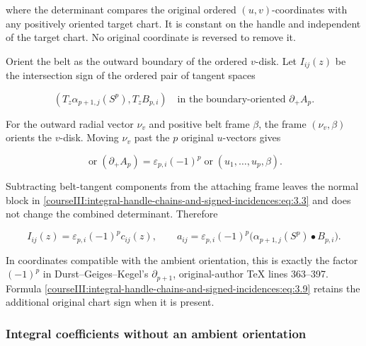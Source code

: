 where the determinant compares the original ordered \((u,v)\)-coordinates with any positively oriented target chart. It is constant on the handle and independent of the target chart. No original coordinate is reversed to remove it.

Orient the belt as the outward boundary of the ordered \(v\)-disk. Let \(I_{ij}(z)\) be the intersection sign of the ordered pair of tangent spaces

\begin{equation}
(T_z\alpha_{p+1,j}(S^p),T_zB_{p,i})
 \quad\text{in the boundary-oriented }\partial_+A_p.
 \label{courseIII:integral-handle-chains-and-signed-incidences:eq:3.7}
\end{equation}

For the outward radial vector \(\nu_v\) and positive belt frame \(\beta\), the frame \((\nu_v,\beta)\) orients the \(v\)-disk. Moving \(\nu_v\) past the \(p\) original \(u\)-vectors gives

\begin{equation}
\operatorname{or}(\partial_+A_p)
 =\varepsilon_{p,i}(-1)^p
 \operatorname{or}(u_1,\ldots,u_p,\beta).
 \label{courseIII:integral-handle-chains-and-signed-incidences:eq:3.8}
\end{equation}

Subtracting belt-tangent components from the attaching frame leaves the normal block in \eqref{courseIII:integral-handle-chains-and-signed-incidences:eq:3.3} and does not change the combined determinant. Therefore

\begin{equation}
I_{ij}(z)=\varepsilon_{p,i}(-1)^p c_{ij}(z),
 \qquad
 a_{ij}=\varepsilon_{p,i}(-1)^p
 \bigl(\alpha_{p+1,j}(S^p)\mathbin{\bullet}B_{p,i}\bigr).
 \label{courseIII:integral-handle-chains-and-signed-incidences:eq:3.9}
\end{equation}

In coordinates compatible with the ambient orientation, this is exactly the factor \((-1)^p\) in Durst--Geiges--Kegel's \(\partial_{p+1}\), original-author TeX lines 363--397. Formula \eqref{courseIII:integral-handle-chains-and-signed-incidences:eq:3.9} retains the additional original chart sign when it is present.

\subsubsection{Integral coefficients without an ambient orientation}
\label{courseIII:integral-handle-chains-and-signed-incidences:section-3.2}

